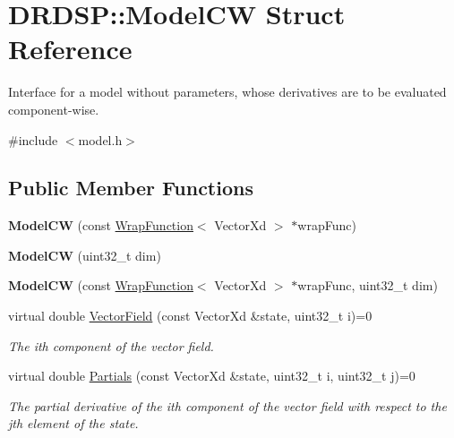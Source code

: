\hypertarget{struct_d_r_d_s_p_1_1_model_c_w}{\section{D\-R\-D\-S\-P\-:\-:Model\-C\-W Struct Reference}
\label{struct_d_r_d_s_p_1_1_model_c_w}
}


Interface for a model without parameters, whose derivatives are to be evaluated component-\/wise.  




{\ttfamily \#include $<$model.\-h$>$}

\subsection*{Public Member Functions}
\begin{DoxyCompactItemize}
\item 
\hypertarget{struct_d_r_d_s_p_1_1_model_c_w_aad20306afd9f81ea9533041b4a71b35c}{{\bfseries Model\-C\-W} (const \hyperlink{struct_d_r_d_s_p_1_1_wrap_function}{Wrap\-Function}$<$ Vector\-Xd $>$ $\ast$wrap\-Func)}\label{struct_d_r_d_s_p_1_1_model_c_w_aad20306afd9f81ea9533041b4a71b35c}

\item 
\hypertarget{struct_d_r_d_s_p_1_1_model_c_w_a49ebb648ddbec569e773bd6370f47116}{{\bfseries Model\-C\-W} (uint32\-\_\-t dim)}\label{struct_d_r_d_s_p_1_1_model_c_w_a49ebb648ddbec569e773bd6370f47116}

\item 
\hypertarget{struct_d_r_d_s_p_1_1_model_c_w_a2b62d9bd8355ee9661e64818d0de8667}{{\bfseries Model\-C\-W} (const \hyperlink{struct_d_r_d_s_p_1_1_wrap_function}{Wrap\-Function}$<$ Vector\-Xd $>$ $\ast$wrap\-Func, uint32\-\_\-t dim)}\label{struct_d_r_d_s_p_1_1_model_c_w_a2b62d9bd8355ee9661e64818d0de8667}

\item 
\hypertarget{struct_d_r_d_s_p_1_1_model_c_w_a4c01cef09698f8bed8ef2e90e130ad8f}{virtual double \hyperlink{struct_d_r_d_s_p_1_1_model_c_w_a4c01cef09698f8bed8ef2e90e130ad8f}{Vector\-Field} (const Vector\-Xd \&state, uint32\-\_\-t i)=0}\label{struct_d_r_d_s_p_1_1_model_c_w_a4c01cef09698f8bed8ef2e90e130ad8f}

\begin{DoxyCompactList}\small\item\em The ith component of the vector field. \end{DoxyCompactList}\item 
\hypertarget{struct_d_r_d_s_p_1_1_model_c_w_a54b6149ba78bba42b360868fa8ecfc20}{virtual double \hyperlink{struct_d_r_d_s_p_1_1_model_c_w_a54b6149ba78bba42b360868fa8ecfc20}{Partials} (const Vector\-Xd \&state, uint32\-\_\-t i, uint32\-\_\-t j)=0}\label{struct_d_r_d_s_p_1_1_model_c_w_a54b6149ba78bba42b360868fa8ecfc20}

\begin{DoxyCompactList}\small\item\em The partial derivative of the ith component of the vector field with respect to the jth element of the state. \end{DoxyCompactList}\end{DoxyCompactItemize}
